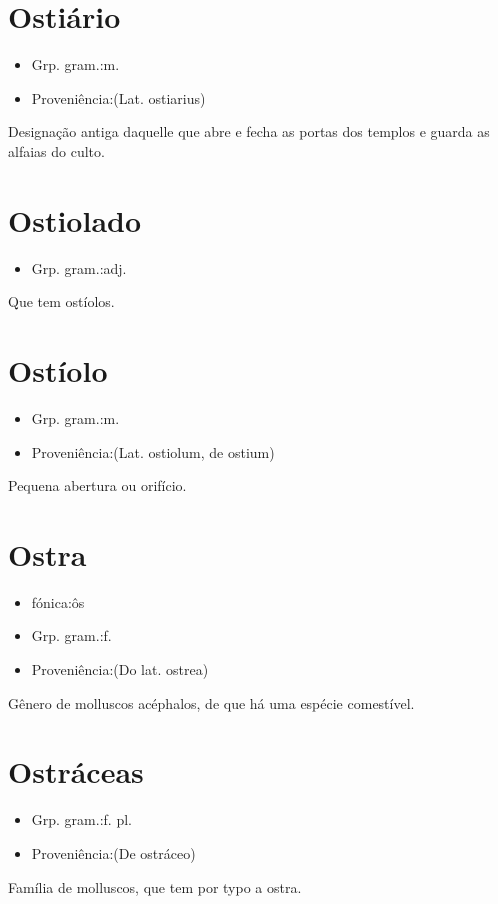 \section{Ostiário}
\begin{itemize}
\item {Grp. gram.:m.}
\end{itemize}
\begin{itemize}
\item {Proveniência:(Lat. \textunderscore ostiarius\textunderscore )}
\end{itemize}
Designação antiga daquelle que abre e fecha as portas dos templos e guarda as alfaias do culto.
\section{Ostiolado}
\begin{itemize}
\item {Grp. gram.:adj.}
\end{itemize}
Que tem ostíolos.
\section{Ostíolo}
\begin{itemize}
\item {Grp. gram.:m.}
\end{itemize}
\begin{itemize}
\item {Proveniência:(Lat. \textunderscore ostiolum\textunderscore , de \textunderscore ostium\textunderscore )}
\end{itemize}
Pequena abertura ou orifício.
\section{Ostra}
\begin{itemize}
\item {fónica:ôs}
\end{itemize}
\begin{itemize}
\item {Grp. gram.:f.}
\end{itemize}
\begin{itemize}
\item {Proveniência:(Do lat. \textunderscore ostrea\textunderscore )}
\end{itemize}
Gênero de molluscos acéphalos, de que há uma espécie comestível.
\section{Ostráceas}
\begin{itemize}
\item {Grp. gram.:f. pl.}
\end{itemize}
\begin{itemize}
\item {Proveniência:(De \textunderscore ostráceo\textunderscore )}
\end{itemize}
Família de molluscos, que tem por typo a ostra.
